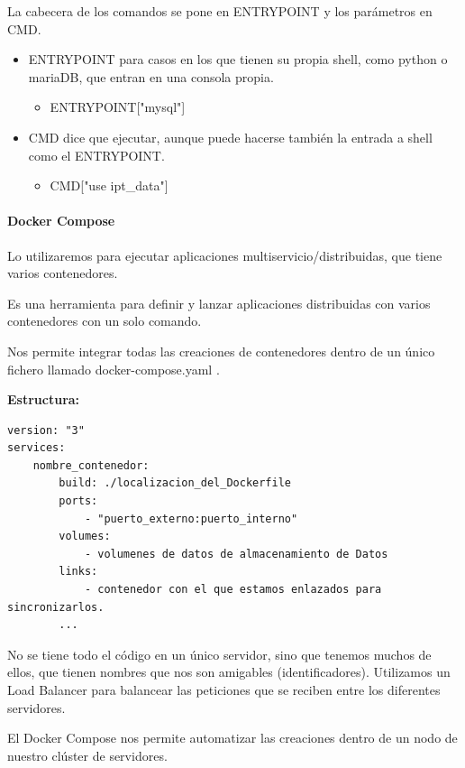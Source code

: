\documentclass[12pt, twoside, openright]{report} %
\begin{document}
\begin{itemize}
	      La cabecera de los comandos se pone en ENTRYPOINT y los parámetros en CMD.
	      \begin{itemize}
		      \item ENTRYPOINT para casos en los que tienen su propia shell, como python o mariaDB, que entran en una consola propia.
		            \begin{itemize}
			            \item ENTRYPOINT["mysql"]
		            \end{itemize}
		      \item CMD dice que ejecutar, aunque puede hacerse también la entrada a shell como el ENTRYPOINT.
		            \begin{itemize}
			            \item CMD["use ipt\_data"]
		            \end{itemize}
	      \end{itemize}
\end{itemize}

\paragraph{Docker Compose}

Lo utilizaremos para ejecutar aplicaciones multiservicio/distribuidas, que tiene varios contenedores.

Es una herramienta para definir y lanzar aplicaciones distribuidas con varios contenedores con un solo comando.

Nos permite integrar todas las creaciones de contenedores dentro de un único fichero llamado docker-compose.yaml .

\textbf{Estructura:}
\begin{lstlisting}
version: "3"
services:
	nombre_contenedor:
		build: ./localizacion_del_Dockerfile
		ports:
			- "puerto_externo:puerto_interno"
		volumes:
			- volumenes de datos de almacenamiento de Datos
		links:
			- contenedor con el que estamos enlazados para sincronizarlos.
		...
\end{lstlisting}

No se tiene todo el código en un único servidor, sino que tenemos muchos de ellos, que tienen nombres que nos son amigables (identificadores).
Utilizamos un Load Balancer para balancear las peticiones que se reciben entre los diferentes servidores.

El Docker Compose nos permite automatizar las creaciones dentro de un nodo de nuestro clúster de servidores.
\end{document}
